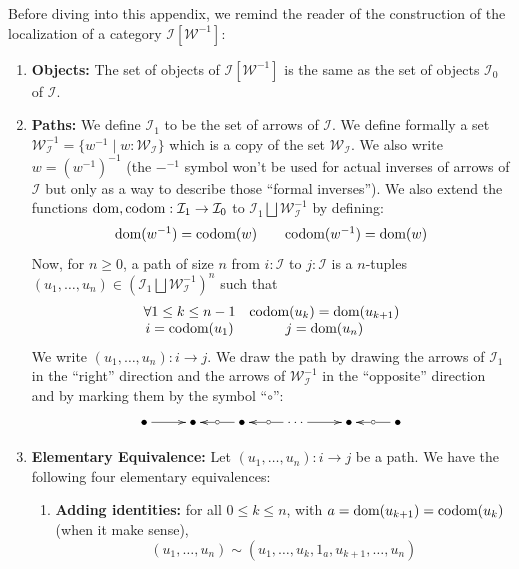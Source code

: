 \documentclass{article}
\numberwithin{equation}{section}
\theoremstyle{definition}
\theoremstyle{plain}
\begin{document}
Before diving into this appendix, we remind the reader of the construction of the localization of a category $\mathcal{I}[\mathcal{W}^{-1}]$:
\begin{enumerate}[label = $\bullet$]
	\item \textbf{Objects:} The set of objects of $\mathcal{I}[\mathcal{W}^{-1}]$ is the same as the set of objects $\mathcal{I}_0$ of $\mathcal{I}$.
	\item \textbf{Paths:} We define $\mathcal{I}_1$ to be the set of arrows of $\mathcal{I}$. We define formally a set $\mathcal{W}_{\mathcal{I}}^{-1} = \{w^{-1}\mid w:\mathcal{W}_{\mathcal{I}}\}$ which is a copy of the set $\mathcal{W}_{\mathcal{I}}$. We also write $w = (w^{-1})^{-1}$ (the $-^{-1}$ symbol won't be used for actual inverses of arrows of $\mathcal{I}$ but only as a way to describe those ``formal inverses''). We also extend the functions $\textnormal{dom}, \textnormal{codom}: \mathcal{I}_1 \to \mathcal{I}_0$ to $\mathcal{I}_1 \bigsqcup \mathcal{W}_{\mathcal{I}}^{-1}$ by defining:
	\[\begin{array}{lcr}
		\textnormal{dom}(w^{-1}) = \textnormal{codom}(w) &&  \textnormal{codom}(w^{-1}) = \textnormal{dom}(w)
	\end{array}\]
	Now, for $n\ge 0$, a path of size $n$ from $i:\mathcal{I}$ to $j:\mathcal{I}$ is a $n$-tuples $(u_1, \dots, u_n) \in (\mathcal{I}_1 \bigsqcup \mathcal{W}_{\mathcal{I}}^{-1})^n$ such that
	\[\begin{array}{cc}
		\forall 1 \le k \le n-1 & \textnormal{codom}(u_k) = \textnormal{dom}(u_{k+1})\\
		i = \textnormal{codom}(u_1) & j = \textnormal{dom}(u_{n})
	\end{array}\]
	We write $(u_1, \dots, u_n): i \to j$. We draw the path by drawing the arrows of $\mathcal{I}_1$ in the ``right'' direction and the arrows of $\mathcal{W}_{\mathcal{I}}^{-1}$ in the ``opposite'' direction and by marking them by the symbol ``$\circ$'':
	\[\xymatrix{
		\bullet \ar[r] & \bullet \ar@{<-}[r]|{\circ} & \bullet \ar@{<-}[r]|{\circ} & \cdots \ar[r] & \bullet \ar@{<-}[r]|{\circ} & \bullet
	}\]
	\item \textbf{Elementary Equivalence:} Let $(u_1, \dots, u_n): i \to j$ be a path. We have the following four elementary equivalences:
	\begin{enumerate}[label = $(\roman*)$]
		\item \textbf{Adding identities:} for all $0 \le k \le n$, with $a = \textnormal{dom}(u_{k+1}) = \textnormal{codom}(u_{k})$ (when it make sense), \[(u_1, \dots, u_n) \sim (u_1, \dots, u_k, 1_a, u_{k+1}, \dots, u_n)\]

\end{enumerate}
\end{enumerate}
\end{document}

